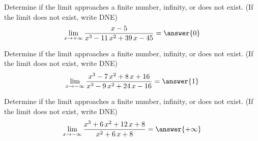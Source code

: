 \documentclass[]{ximera}
\begin{document}
\begin{problem}
Determine if the limit approaches a finite number, infinity, or does not exist. (If the limit does not exist, write DNE)
%
\[\lim_{x\to{+\infty}}\dfrac{x - 5}{x^{3} - 11 \, x^{2} + 39 \, x - 45}=\answer{0}\]

\end{problem}


\begin{problem}
Determine if the limit approaches a finite number, infinity, or does not exist. (If the limit does not exist, write DNE)
%
\[\lim_{x\to{-\infty}}\dfrac{x^{3} - 7 \, x^{2} + 8 \, x + 16}{x^{3} - 9 \, x^{2} + 24 \, x - 16}=\answer{1}\]

\end{problem}

\begin{problem}
Determine if the limit approaches a finite number, infinity, or does not exist. (If the limit does not exist, write DNE)
%
\[\lim_{x\to{-\infty}}\dfrac{x^{3} + 6 \, x^{2} + 12 \, x + 8}{x^{2} + 6 \, x + 8}=\answer{+\infty}\]

\end{problem}
\end{document}

